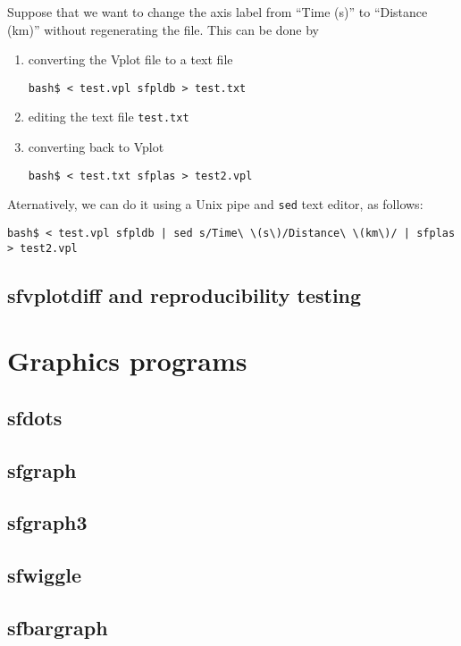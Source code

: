 Suppose that we want to change the axis label from ``Time (s)'' to ``Distance (km)'' without regenerating the file. This can be done by
\begin{enumerate}
\item converting the Vplot file to a text file
\begin{verbatim}
bash$ < test.vpl sfpldb > test.txt
\end{verbatim}
\item editing the text file \texttt{test.txt}
\item converting back to Vplot
\begin{verbatim}
bash$ < test.txt sfplas > test2.vpl
\end{verbatim}
\end{enumerate}

Aternatively, we can do it using a Unix pipe and \texttt{sed} text editor, as follows:
\begin{verbatim}
bash$ < test.vpl sfpldb | sed s/Time\ \(s\)/Distance\ \(km\)/ | sfplas > test2.vpl
\end{verbatim}

\subsection{sfvplotdiff and reproducibility testing}

\section{Graphics programs}

\subsection{sfdots}

\subsection{sfgraph}

\subsection{sfgraph3}

\subsection{sfwiggle}

\subsection{sfbargraph}

